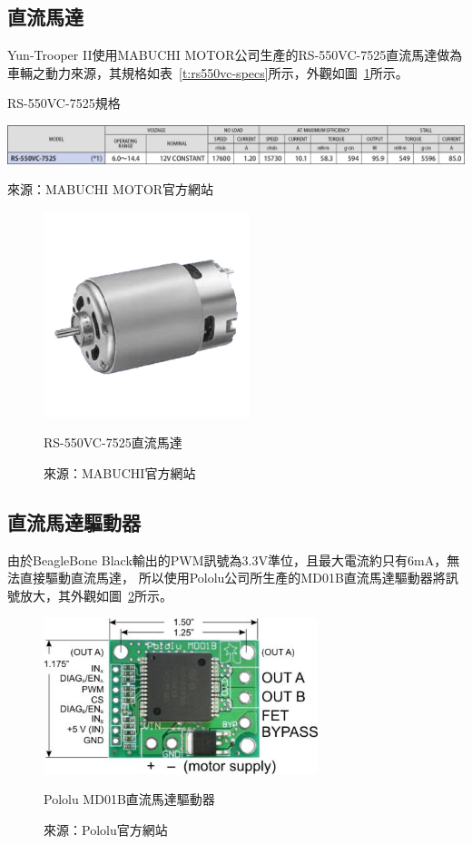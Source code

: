 \subsection{直流馬達}
Yun-Trooper II使用MABUCHI MOTOR公司生產的RS-550VC-7525直流馬達做為車輛之動力來源，其規格如表~\ref{t:rs550vc-specs}所示，外觀如圖~\ref{f:rs550vc}所示。

\begin{table}[h!]
	\centering
	\caption{RS-550VC-7525規格}
	\label{t:rs550vc-specs}
	\includegraphics[width=\textwidth]{tables/RS550VC-specs}
	\caption*{來源：MABUCHI MOTOR官方網站}
\end{table}

\begin{figure}[h!]
	\centering
	\includegraphics[width=6cm]{figures/hardware/motor}
	\caption{RS-550VC-7525直流馬達}
	\caption*{來源：MABUCHI官方網站}
	\label{f:rs550vc}
\end{figure}

\subsection{直流馬達驅動器}
由於BeagleBone Black輸出的PWM訊號為3.3V準位，且最大電流約只有6mA，無法直接驅動直流馬達，
所以使用Pololu公司所生產的MD01B直流馬達驅動器將訊號放大，其外觀如圖~\ref{f:motor_driver}所示。

\begin{figure}[h!]
	\centering
	\includegraphics[width=8cm]{figures/hardware/motor_driver}
	\caption{Pololu MD01B直流馬達驅動器}
	\caption*{來源：Pololu官方網站}
	\label{f:motor_driver}
\end{figure}

